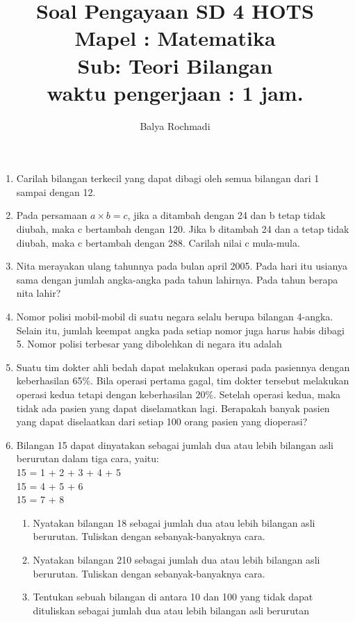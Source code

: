 \documentclass[12pt,a4paper,draft,final,oneside,twoside,openright,openany]{article}
\author{Balya Rochmadi}
\title{Soal Pengayaan SD 4 HOTS\\ Mapel : Matematika\\ Sub: Teori Bilangan\\ \small waktu pengerjaan : 1 jam.}
\begin{document}
	\maketitle
	\Large
	\noindent\makebox[\linewidth]{\rule{\paperwidth}{0.4pt}}
	\begin{enumerate}
	
	
	\item Carilah bilangan terkecil yang dapat dibagi oleh semua bilangan dari 1 sampai dengan 12.
	\item Pada persamaan $a\times b = c$, jika a ditambah dengan 24 dan b tetap tidak diubah, maka c
	bertambah dengan 120. Jika b ditambah 24 dan a tetap tidak diubah, maka c bertambah
	dengan 288. Carilah nilai c mula-mula.
	\item Nita merayakan ulang tahunnya pada bulan april 2005. Pada hari itu usianya sama
	dengan jumlah angka-angka pada tahun lahirnya. Pada tahun berapa nita lahir?
	\item Nomor polisi mobil-mobil di suatu negara selalu berupa bilangan 4-angka.
	Selain itu, jumlah keempat angka pada setiap nomor juga harus habis dibagi 5. Nomor
	polisi terbesar yang dibolehkan di negara itu adalah
	\item Suatu tim dokter ahli bedah dapat melakukan operasi pada pasiennya
	dengan keberhasilan 65$\%$. Bila operasi pertama gagal, tim dokter tersebut melakukan
	operasi kedua tetapi dengan keberhasilan $20\%$. Setelah operasi kedua, maka tidak ada
	pasien yang dapat diselamatkan lagi. Berapakah banyak pasien yang dapat diselaatkan
	dari setiap 100 orang pasien yang dioperasi?
	\item Bilangan 15 dapat dinyatakan sebagai jumlah dua atau lebih bilangan asli
	berurutan dalam tiga cara, yaitu:\\
	15 = 1 + 2 + 3 + 4 + 5\\
	15 = 4 + 5 + 6\\
	15 = 7 + 8\\
	\begin{enumerate}
		\item Nyatakan bilangan 18 sebagai jumlah dua atau lebih bilangan asli berurutan. Tuliskan
		dengan sebanyak-banyaknya cara.
		\item Nyatakan bilangan 210 sebagai jumlah dua atau lebih bilangan asli berurutan.
		Tuliskan dengan sebanyak-banyaknya cara.
		\item  Tentukan sebuah bilangan di antara 10 dan 100 yang tidak dapat dituliskan sebagai
		jumlah dua atau lebih bilangan asli berurutan
	\end{enumerate}

\end{enumerate}
\end{document}
